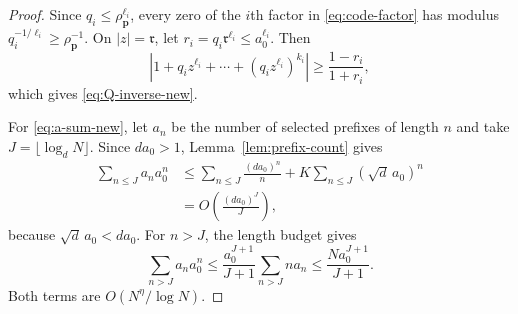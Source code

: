 \documentclass[journal]{IEEEtran}
\theoremstyle{plain}
\theoremstyle{definition}
\theoremstyle{remark}
\newcommand{\rhoP}{\rho_{\mathbf p}}
\begin{document}
\begin{proof}
Since $q_i\le\rhoP^{\ell_i}$, every zero of the $i$th factor in \eqref{eq:code-factor} has modulus $q_i^{-1/\ell_i}\ge\rhoP^{-1}$.  On $|z|=\mathfrak r$, let $r_i=q_i\mathfrak r^{\ell_i}\le a_0^{\ell_i}$.  Then
\begin{equation*}
 |1+q_iz^{\ell_i}+\cdots+(q_iz^{\ell_i})^{k_i}|
 \ge\frac{1-r_i}{1+r_i},
\end{equation*}
which gives \eqref{eq:Q-inverse-new}.

For \eqref{eq:a-sum-new}, let $a_n$ be the number of selected prefixes of length $n$ and take $J=\lfloor\log_dN\rfloor$.  Since $da_0>1$, Lemma~\ref{lem:prefix-count} gives
\begin{align*}
 \sum_{n\le J}a_na_0^n
 &\le \sum_{n\le J}\frac{(da_0)^n}{n}
   +K\sum_{n\le J}(\sqrt d\,a_0)^n\\
 &=O\left(\frac{(da_0)^J}{J}\right),
\end{align*}
because $\sqrt d\,a_0<da_0$.
For $n>J$, the length budget gives
\begin{equation*}
 \sum_{n>J}a_na_0^n
 \le\frac{a_0^{J+1}}{J+1}\sum_{n>J}na_n
 \le\frac{Na_0^{J+1}}{J+1}.
\end{equation*}
Both terms are $O(N^\eta/\log N)$.
\end{proof}
\end{document}
